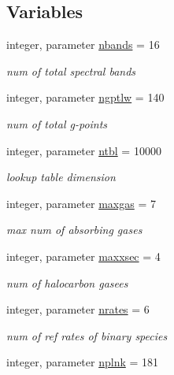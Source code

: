 \subsection*{Variables}
\begin{DoxyCompactItemize}
\item 
integer, parameter \hyperlink{namespacemodule__radlw__parameters_a48e11b992a80595d71c92f7c9bfbe19c}{nbands} = 16
\begin{DoxyCompactList}\small\item\em num of total spectral bands \end{DoxyCompactList}\item 
integer, parameter \hyperlink{namespacemodule__radlw__parameters_a05fe17fe932ce62a3ae2c6c564584321}{ngptlw} = 140
\begin{DoxyCompactList}\small\item\em num of total g-\/points \end{DoxyCompactList}\item 
integer, parameter \hyperlink{namespacemodule__radlw__parameters_a61ae33b9db5bac9962f72e2a0db3c0e4}{ntbl} = 10000
\begin{DoxyCompactList}\small\item\em lookup table dimension \end{DoxyCompactList}\item 
integer, parameter \hyperlink{namespacemodule__radlw__parameters_a01330b4ad09907f2db51cb516ed21033}{maxgas} = 7
\begin{DoxyCompactList}\small\item\em max num of absorbing gases \end{DoxyCompactList}\item 
integer, parameter \hyperlink{namespacemodule__radlw__parameters_a5817221936731c6ee6443da6a64e934e}{maxxsec} = 4
\begin{DoxyCompactList}\small\item\em num of halocarbon gasees \end{DoxyCompactList}\item 
integer, parameter \hyperlink{namespacemodule__radlw__parameters_a86288e4bbe3d6962505488790ff42bfa}{nrates} = 6
\begin{DoxyCompactList}\small\item\em num of ref rates of binary species \end{DoxyCompactList}\item 
integer, parameter \hyperlink{namespacemodule__radlw__parameters_a7ade2de4de94ec6e7a0e97321143e2e6}{nplnk} = 181

\end{DoxyCompactItemize}
